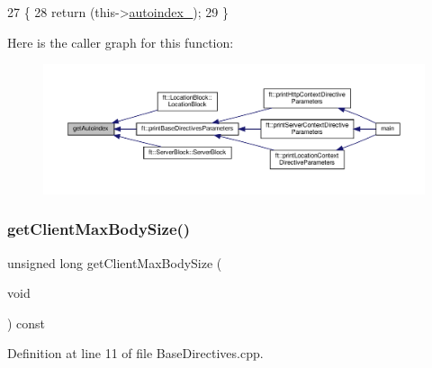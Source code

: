 \begin{DoxyCode}
27     \{
28         \textcolor{keywordflow}{return} (this->\hyperlink{classft_1_1_base_directives_a4ebffbe32f50a462afa139c6f03c1a4f}{autoindex\_});
29     \}
\end{DoxyCode}
Here is the caller graph for this function\+:
\nopagebreak
\begin{figure}[H]
\begin{center}
\leavevmode
\includegraphics[width=350pt]{classft_1_1_base_directives_a4c11ed7ad76aeac228b029a2444de568_icgraph}
\end{center}
\end{figure}
\mbox{\label{classft_1_1_base_directives_a930398ba1e4b99b2ba01a60dcda0c923}} 
\subsubsection{\texorpdfstring{get\+Client\+Max\+Body\+Size()}{getClientMaxBodySize()}}
{\footnotesize\ttfamily unsigned long get\+Client\+Max\+Body\+Size (\begin{DoxyParamCaption}\item[{void}]{ }\end{DoxyParamCaption}) const\hspace{0.3cm}{\ttfamily [inherited]}}



Definition at line 11 of file Base\+Directives.\+cpp.


